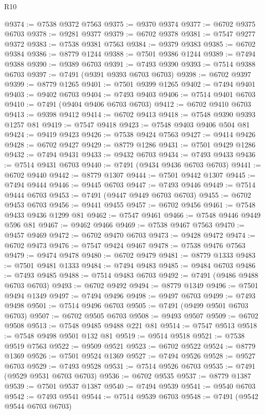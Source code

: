 \begin{lexlean}{R10}
\begin{coremodule}
{{{{{{{{{{{{{{{{{{{{{{{{{{{{{{{{{{{{{{{{{{{{{{{{{{{{{{{{{{{{{{{{{{{{{{{{{{{{{{{{{{{{@9374 := @7538 @9372 @7563
@9375 := @9370 @9374
@9377 := @6702 @9375 @6703
@9378 := @9281 @9377
@9379 := @6702 @9378
@9381 := @7547 @9277 @9372
@9383 := @7538 @9381 @7563
@9384 := @9379 @9383
@9385 := @6702 @9384
@9386 := @8779 @1244
@9388 := @7501 @9386 @1244
@9389 := @7494 @9388
@9390 := @9389 @6703
@9391 := @7493 @9390
@9393 := @7514 @9388 @6703
@9397 := @7491 (@9391 @9393 @6703 @6703)
@9398 := @6702 @9397
@9399 := @8779 @1265
@9401 := @7501 @9399 @1265
@9402 := @7494 @9401
@9403 := @9402 @6703
@9404 := @7493 @9403
@9406 := @7514 @9401 @6703
@9410 := @7491 (@9404 @9406 @6703 @6703)
@9412 := @6702 @9410 @6703
@9413 := @9398 @9412
@9414 := @6702 @9413
@9418 := @7548 @9390 @9393 @1257 @81
@9419 := @7547 @9418
@9423 := @7548 @9403 @9406 @504 @81
@9424 := @9419 @9423
@9426 := @7538 @9424 @7563
@9427 := @9414 @9426
@9428 := @6702 @9427
@9429 := @8779 @1286
@9431 := @7501 @9429 @1286
@9432 := @7494 @9431
@9433 := @9432 @6703
@9434 := @7493 @9433
@9436 := @7514 @9431 @6703
@9440 := @7491 (@9434 @9436 @6703 @6703)
@9441 := @6702 @9440
@9442 := @8779 @1307
@9444 := @7501 @9442 @1307
@9445 := @7494 @9444
@9446 := @9445 @6703
@9447 := @7493 @9446
@9449 := @7514 @9444 @6703
@9453 := @7491 (@9447 @9449 @6703 @6703)
@9455 := @6702 @9453 @6703
@9456 := @9441 @9455
@9457 := @6702 @9456
@9461 := @7548 @9433 @9436 @1299 @81
@9462 := @7547 @9461
@9466 := @7548 @9446 @9449 @596 @81
@9467 := @9462 @9466
@9469 := @7538 @9467 @7563
@9470 := @9457 @9469
@9472 := @6702 @9470 @6703
@9473 := @9428 @9472
@9474 := @6702 @9473
@9476 := @7547 @9424 @9467
@9478 := @7538 @9476 @7563
@9479 := @9474 @9478
@9480 := @6702 @9479
@9481 := @8779 @1333
@9483 := @7501 @9481 @1333
@9484 := @7494 @9483
@9485 := @9484 @6703
@9486 := @7493 @9485
@9488 := @7514 @9483 @6703
@9492 := @7491 (@9486 @9488 @6703 @6703)
@9493 := @6702 @9492
@9494 := @8779 @1349
@9496 := @7501 @9494 @1349
@9497 := @7494 @9496
@9498 := @9497 @6703
@9499 := @7493 @9498
@9501 := @7514 @9496 @6703
@9505 := @7491 (@9499 @9501 @6703 @6703)
@9507 := @6702 @9505 @6703
@9508 := @9493 @9507
@9509 := @6702 @9508
@9513 := @7548 @9485 @9488 @221 @81
@9514 := @7547 @9513
@9518 := @7548 @9498 @9501 @132 @81
@9519 := @9514 @9518
@9521 := @7538 @9519 @7563
@9522 := @9509 @9521
@9523 := @6702 @9522
@9524 := @8779 @1369
@9526 := @7501 @9524 @1369
@9527 := @7494 @9526
@9528 := @9527 @6703
@9529 := @7493 @9528
@9531 := @7514 @9526 @6703
@9535 := @7491 (@9529 @9531 @6703 @6703)
@9536 := @6702 @9535
@9537 := @8779 @1387
@9539 := @7501 @9537 @1387
@9540 := @7494 @9539
@9541 := @9540 @6703
@9542 := @7493 @9541
@9544 := @7514 @9539 @6703
@9548 := @7491 (@9542 @9544 @6703 @6703)
}}}}}}}}}}}}}}}}}}}}}}}}}}}}}}}}}}}}}}}}}}}}}}}}}}}}}}}}}}}}}}}}}}}}}}}}}}}}}}}}}}}}
\end{coremodule}
\end{lexlean}

